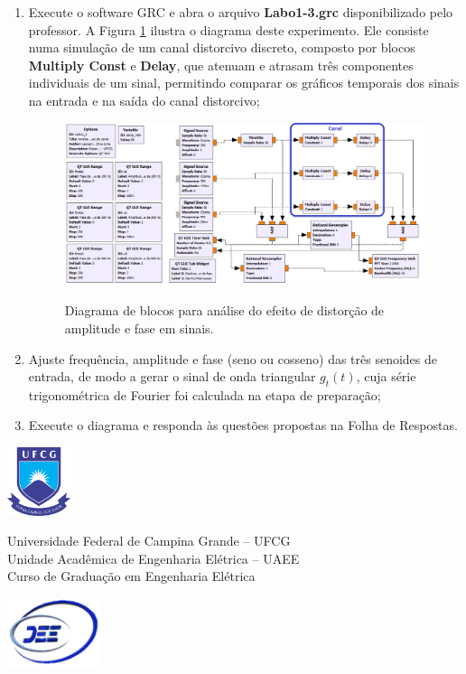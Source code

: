 \documentclass[12pt,addpoints]{exam}
\newcommand{\myscale}{0.4}
\begin{document}
\begin{enumerate}
    \item Execute o software GRC e abra o arquivo \textbf{Labo1-3.grc} disponibilizado pelo professor. A Figura \ref{fig:GRC_1-3} ilustra o diagrama deste experimento. Ele consiste numa simulação de um canal distorcivo discreto, composto por blocos \textbf{Multiply Const} e \textbf{Delay}, que atenuam e atrasam três componentes individuais de um sinal, permitindo comparar os gráficos temporais dos sinais na entrada e na saída do canal distorcivo;
    \begin{figure}[htb]
        \centering
        \includegraphics[scale=\myscale]{./Figuras/GRC_1-3} \\
        \caption{Diagrama de blocos para análise do efeito de distorção de amplitude e fase em sinais.} 
        \label{fig:GRC_1-3}
    \end{figure}
    \item Ajuste frequência, amplitude e fase (seno ou cosseno) das três senoides de entrada, de modo a gerar o sinal de onda triangular $g_{t}(t)$, cuja série trigonométrica de Fourier foi calculada na etapa de preparação;    
    \item Execute o diagrama e responda às questões propostas na Folha de Respostas.
\end{enumerate}

\newpage {}

\noindent \includegraphics[height=2cm]{../Figuras/UFCGLogo} \hfill
\begin{minipage}{.66\textwidth} \large \centering \vspace{-1.8cm}
    Universidade Federal de Campina Grande -- UFCG \\
    Unidade Acadêmica de Engenharia Elétrica -- UAEE \\
    Curso de Graduação em Engenharia Elétrica
\end{minipage}
\hfill \includegraphics[height=2cm]{../Figuras/DEELogo} \\[12pt]
\end{document}
